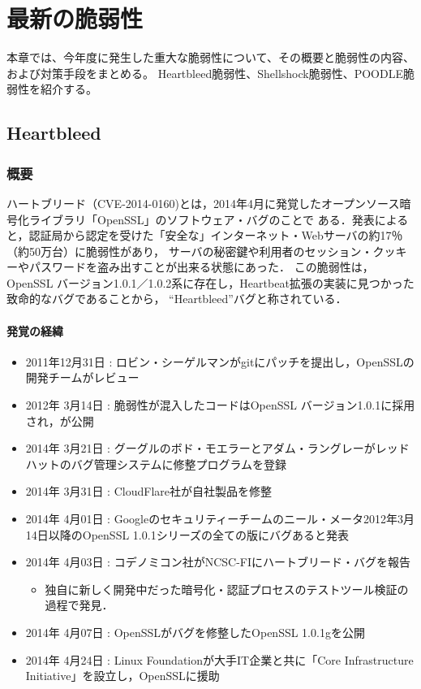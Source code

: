 \chapter{最新の脆弱性}

本章では、今年度に発生した重大な脆弱性について、その概要と脆弱性の内容、および対策手段をまとめる。
Heartbleed脆弱性、Shellshock脆弱性、POODLE脆弱性を紹介する。

\section{Heartbleed}

\subsection{概要}
ハートブリード（CVE-2014-0160)\cite{cve}とは，2014年4月に発覚したオープンソース暗号化ライブラリ「OpenSSL」のソフトウェア・バグのことで
ある．発表によると，認証局から認定を受けた「安全な」インターネット・Webサーバの約17％（約50万台）\cite{wiki}に脆弱性があり，
サーバの秘密鍵や利用者のセッション・クッキーやパスワードを盗み出すことが出来る状態にあった．
この脆弱性は，OpenSSL バージョン1.0.1／1.0.2系に存在し，Heartbeat拡張の実装に見つかった致命的なバグであることから，
``Heartbleed''バグと称されている．

\subsubsection{発覚の経緯}
\begin{itemize}
\item 2011年12月31日 : ロビン・シーゲルマンがgitにパッチを提出し，OpenSSLの開発チームがレビュー
\item 2012年 3月14日 : 脆弱性が混入したコードはOpenSSL バージョン1.0.1に採用され，が公開
\item 2014年 3月21日 : グーグルのボド・モエラーとアダム・ラングレーがレッドハットのバグ管理システムに修整プログラムを登録
\item 2014年 3月31日 : CloudFlare社が自社製品を修整
\item 2014年 4月01日 : Googleのセキュリティーチームのニール・メータ2012年3月14日以降のOpenSSL 1.0.1シリーズの全ての版にバグあると発表
\item 2014年 4月03日 : コデノミコン社がNCSC-FIにハートブリード・バグを報告
  \begin{itemize}
  \item 独自に新しく開発中だった暗号化・認証プロセスのテストツール検証の過程で発見\cite{hb}．
  \end{itemize}

\item 2014年 4月07日 : OpenSSLがバグを修整したOpenSSL 1.0.1gを公開
\item 2014年 4月24日 : Linux Foundationが大手IT企業と共に「Core Infrastructure Initiative」を設立し，OpenSSLに援助
\end{itemize}

